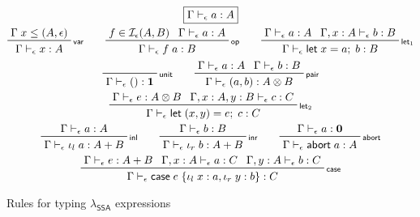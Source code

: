 \documentclass[acmsmall,screen,review]{acmart}
\newcommand{\mc}[1]{\ensuremath{\mathcal{#1}}}
\newcommand{\mb}[1]{\ensuremath{\mathbf{#1}}}
\newcommand{\ms}[1]{\ensuremath{\mathsf{#1}}}
\newcommand{\lto}{:}
\newcommand{\linl}[1]{\iota_l\;{#1}}
\newcommand{\linr}[1]{\iota_r\;{#1}}
\newcommand{\labort}[1]{\ms{abort}\;{#1}}
\newcommand{\letexpr}[3]{\ensuremath{\ms{let}\;#1 = #2;\;#3}}
\newcommand{\caseexpr}[5]{\ms{case}\;#1\;\{\linl{#2} \lto #3, \linr{#4} \lto #5\}}
\newcommand{\bhyp}[2]{#1 : #2}
\newcommand{\rle}[1]{{\scriptsize\textsf{#1}}}
\newcommand{\hasty}[4]{#1 \vdash_{#2} #3: {#4}}
\newcommand{\isop}[4]{#1 \in \mc{I}_{#4}(#2, #3)}
\newcommand{\isotopessa}{\(\lambda_{\ms{SSA}}\)}
\begin{document}
\begin{figure}
  \begin{gather*}
    \boxed{\hasty{\Gamma}{\epsilon}{a}{A}} \\
    \prftree[r]{\rle{var}}{\Gamma\;x \leq (A, \epsilon)}{\hasty{\Gamma}{\epsilon}{x}{A}} \qquad
    \prftree[r]{\rle{op}}{\isop{f}{A}{B}{\epsilon}}{\hasty{\Gamma}{\epsilon}{a}{A}}
      {\hasty{\Gamma}{\epsilon}{f\;a}{B}} \qquad
    \prftree[r]{\rle{let$_1$}}
      {\hasty{\Gamma}{\epsilon}{a}{A}}
      {\hasty{\Gamma, \bhyp{x}{A}}{\epsilon}{b}{B}}
      {\hasty{\Gamma}{\epsilon}{\letexpr{x}{a}{b}}{B}} \\
    \prftree[r]{\rle{unit}}{\hasty{\Gamma}{\epsilon}{()}{\mb{1}}} \qquad
    \prftree[r]{\rle{pair}}{\hasty{\Gamma}{\epsilon}{a}{A}}{\hasty{\Gamma}{\epsilon}{b}{B}}
      {\hasty{\Gamma}{\epsilon}{(a, b)}{A \otimes B}} \\
    \prftree[r]{\rle{let$_2$}}
      {\hasty{\Gamma}{\epsilon}{e}{A \otimes B}}
      {\hasty{\Gamma, \bhyp{x}{A}, \bhyp{y}{B}}{\epsilon}{c}{C}}
      {\hasty{\Gamma}{\epsilon}{\letexpr{(x, y)}{e}{c}}{C}} \\
    \prftree[r]{\rle{inl}}{\hasty{\Gamma}{\epsilon}{a}{A}}
      {\hasty{\Gamma}{\epsilon}{\linl{a}}{A + B}} \qquad
    \prftree[r]{\rle{inr}}{\hasty{\Gamma}{\epsilon}{b}{B}}
      {\hasty{\Gamma}{\epsilon}{\linr{b}}{A + B}} \qquad
    \prftree[r]{\rle{abort}}{\hasty{\Gamma}{\epsilon}{a}{\mb{0}}}
      {\hasty{\Gamma}{\epsilon}{\labort{a}}{A}} \\
    \prftree[r]{\rle{case}}
      {\hasty{\Gamma}{\epsilon}{e}{A + B}}
      {\hasty{\Gamma, \bhyp{x}{A}}{\epsilon}{a}{C}}
      {\hasty{\Gamma, \bhyp{y}{A}}{\epsilon}{b}{C}}
      {\hasty{\Gamma}{\epsilon}{\caseexpr{e}{x}{a}{y}{b}}{C}}
  \end{gather*}
  \caption{Rules for typing \isotopessa{} expressions}
  \Description{}
  \label{fig:ssa-expr-rules}
\end{figure}
\end{document}
